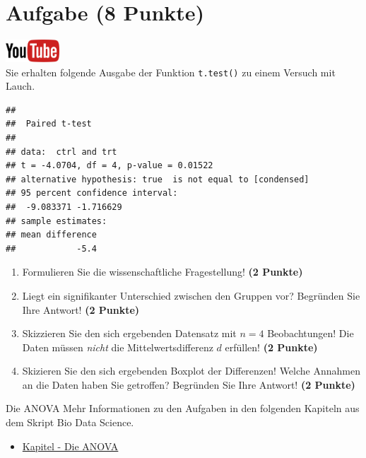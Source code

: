\documentclass[a4paper, 9pt]{scrartcl}\usepackage[]{graphicx}\usepackage[]{xcolor}
\makeatletter
\newenvironment{kframe}{%
 \def\at@end@of@kframe{}%
 \ifinner\ifhmode%
  \def\at@end@of@kframe{\end{minipage}}%
  \begin{minipage}{\columnwidth}%
 \fi\fi%
 \def\FrameCommand##1{\hskip\@totalleftmargin \hskip-\fboxsep
 \colorbox{shadecolor}{##1}\hskip-\fboxsep
     \hskip-\linewidth \hskip-\@totalleftmargin \hskip\columnwidth}%
 \MakeFramed {\advance\hsize-\width
   \@totalleftmargin\z@ \linewidth\hsize
   \@setminipage}}%
 {\par\unskip\endMakeFramed%
 \at@end@of@kframe}
\newenvironment{knitrout}{}{} %
\makeatother
\begin{document}
\clearpage

\section{Aufgabe \hfill (8 Punkte)}

\hfill\href{https://youtu.be/kHmfEmU6lrk}{\includegraphics[width =
  2cm]{img/youtube}}\\[1Ex]



Sie erhalten folgende \Rlogo Ausgabe der Funktion \texttt{t.test()} zu einem Versuch mit Lauch.

\begin{knitrout}
\color{fgcolor}\begin{kframe}
\begin{verbatim}
## 
## 	Paired t-test
## 
## data:  ctrl and trt
## t = -4.0704, df = 4, p-value = 0.01522
## alternative hypothesis: true  is not equal to [condensed]
## 95 percent confidence interval:
##  -9.083371 -1.716629
## sample estimates:
## mean difference 
##            -5.4
\end{verbatim}
\end{kframe}
\end{knitrout}


\begin{enumerate}
  \item Formulieren Sie die wissenschaftliche Fragestellung! \textbf{(2
Punkte)}
\item Liegt ein signifikanter Unterschied zwischen den Gruppen vor?
  Begr{\"u}nden Sie Ihre Antwort! \textbf{(2 Punkte)}
\item Skizzieren Sie den sich ergebenden Datensatz mit $n = 4$
  Beobachtungen! Die Daten m{\"u}ssen \textit{nicht} die Mittelwertsdifferenz
  $d$ erf{\"u}llen! \textbf{(2 Punkte)} 
\item Skizieren Sie den sich ergebenden Boxplot der Differenzen! Welche Annahmen an die Daten haben Sie getroffen? Begr{\"u}nden Sie Ihre Antwort! \textbf{(2 Punkte)} 
\end{enumerate}
 
\clearpage
\begin{graybox}{Die ANOVA}
Mehr Informationen zu den Aufgaben in den folgenden Kapiteln aus dem Skript Bio Data Science.
  \begin{itemize}
  \item \href{https://jkruppa.github.io/stat-tests-anova.html}{Kapitel - Die ANOVA}
  \end{itemize}
\end{graybox}
\clearpage
\end{document}

